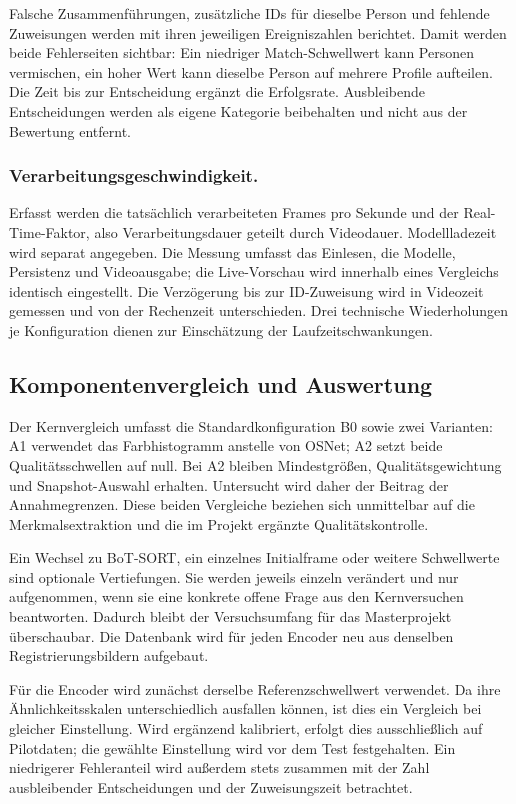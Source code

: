 \documentclass[runningheads]{llncs}
\begin{document}
Falsche Zusammenführungen, zusätzliche IDs für dieselbe Person und fehlende Zuweisungen werden mit ihren jeweiligen Ereigniszahlen berichtet. Damit werden beide Fehlerseiten sichtbar: Ein niedriger Match-Schwellwert kann Personen vermischen, ein hoher Wert kann dieselbe Person auf mehrere Profile aufteilen. Die Zeit bis zur Entscheidung ergänzt die Erfolgsrate. Ausbleibende Entscheidungen werden als eigene Kategorie beibehalten und nicht aus der Bewertung entfernt.

\subsubsection{Verarbeitungsgeschwindigkeit.}
Erfasst werden die tatsächlich verarbeiteten Frames pro Sekunde und der Real-Time-Faktor, also Verarbeitungsdauer geteilt durch Videodauer. Modellladezeit wird separat angegeben. Die Messung umfasst das Einlesen, die Modelle, Persistenz und Videoausgabe; die Live-Vorschau wird innerhalb eines Vergleichs identisch eingestellt. Die Verzögerung bis zur ID-Zuweisung wird in Videozeit gemessen und von der Rechenzeit unterschieden. Drei technische Wiederholungen je Konfiguration dienen zur Einschätzung der Laufzeitschwankungen.

\subsection{Komponentenvergleich und Auswertung}

Der Kernvergleich umfasst die Standardkonfiguration B0 sowie zwei Varianten: A1 verwendet das Farbhistogramm anstelle von OSNet; A2 setzt beide Qualitätsschwellen auf null. Bei A2 bleiben Mindestgrö{\ss}en, Qualitätsgewichtung und Snapshot-Auswahl erhalten. Untersucht wird daher der Beitrag der Annahmegrenzen. Diese beiden Vergleiche beziehen sich unmittelbar auf die Merkmalsextraktion und die im Projekt ergänzte Qualitätskontrolle.

Ein Wechsel zu BoT-SORT, ein einzelnes Initialframe oder weitere Schwellwerte sind optionale Vertiefungen. Sie werden jeweils einzeln verändert und nur aufgenommen, wenn sie eine konkrete offene Frage aus den Kernversuchen beantworten. Dadurch bleibt der Versuchsumfang für das Masterprojekt überschaubar. Die Datenbank wird für jeden Encoder neu aus denselben Registrierungsbildern aufgebaut.

Für die Encoder wird zunächst derselbe Referenzschwellwert verwendet. Da ihre Ähnlichkeitsskalen unterschiedlich ausfallen können, ist dies ein Vergleich bei gleicher Einstellung. Wird ergänzend kalibriert, erfolgt dies ausschlie{\ss}lich auf Pilotdaten; die gewählte Einstellung wird vor dem Test festgehalten. Ein niedrigerer Fehleranteil wird au{\ss}erdem stets zusammen mit der Zahl ausbleibender Entscheidungen und der Zuweisungszeit betrachtet.
\end{document}
